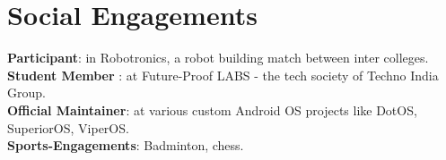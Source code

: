 \section{Social Engagements}
    \begin{itemize}[leftmargin=0.15in, label={}]
	\small{\item{
		\textbf{Participant}{: in Robotronics, a robot building match between inter colleges.} \\
		\textbf{Student Member}{ : at Future-Proof LABS - the tech society of Techno India Group.} \\
		\textbf{Official Maintainer}{: at various custom Android OS projects like DotOS, SuperiorOS, ViperOS.} \\
        \textbf{Sports-Engagements}{: Badminton, chess.}
	}}
    \end{itemize}